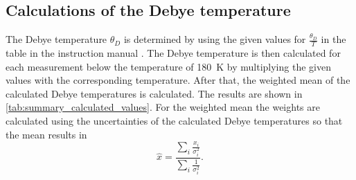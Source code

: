 \subsection{Calculations of the Debye temperature}
\label{sec:debye_temperature}

The Debye temperature $\theta_D$ is determined by using the given values for $\frac{\theta_D}{T}$ in the table in the instruction manual \cite{V47}. The Debye temperature is then calculated
for each measurement below the temperature of \SI{180}{\kelvin} by multiplying the given values with the corresponding temperature. After that, the weighted mean of the calculated Debye temperatures
is calculated. The results are shown in \autoref{tab:summary_calculated_values}. For the weighted mean the weights are calculated using the uncertainties of the calculated Debye temperatures so that 
the mean results in
\begin{equation*}
    \hat{x} = \frac{\sum_i \frac{x_i}{\sigma_i^2}}{\sum_i \frac{1}{\sigma_i^2}}.
\end{equation*}

